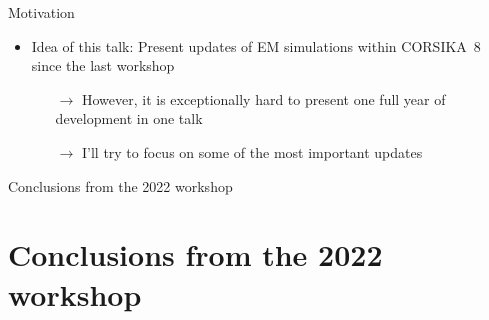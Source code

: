 \documentclass[aspectratio=1610, 9pt]{beamer}
\begin{document}
\begin{frame}{Motivation}
  \begin{itemize}
    \item Idea of this talk: Present updates of EM simulations within CORSIKA~8 since the last workshop
    \begin{itemize}
        \item[$\rightarrow$] However, it is exceptionally hard to present one full year of development in one talk
        \item[$\rightarrow$] I'll try to focus on some of the most important updates
    \end{itemize}
  \end{itemize}
\end{frame}

\begin{frame}
  \begin{center}
    \Huge Conclusions from the 2022 workshop
  \end{center}
\end{frame}

\section{Conclusions from the 2022 workshop}
\end{document}
